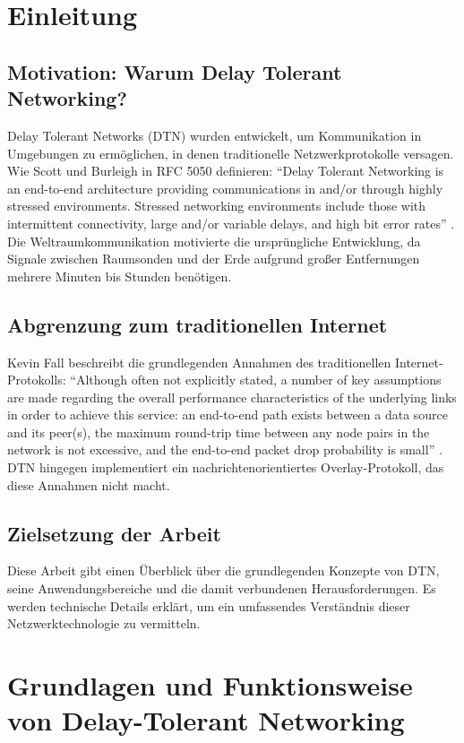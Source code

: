 \documentclass[paper=a4,fontsize=12pt,ngerman]{scrartcl}
\begin{document}
\section{Einleitung}

\subsection{Motivation: Warum Delay Tolerant Networking?}
Delay Tolerant Networks (DTN) wurden entwickelt, um Kommunikation in Umgebungen zu ermöglichen, in denen traditionelle Netzwerkprotokolle versagen. 
Wie Scott und Burleigh in RFC 5050 definieren: \enquote{Delay Tolerant Networking is an end-to-end architecture providing communications in and/or through highly stressed environments. Stressed networking environments include those with intermittent connectivity, large and/or variable delays, and high bit error rates} \cite[S. 3]{ScBu07}.
Die Weltraumkommunikation motivierte die ursprüngliche Entwicklung, da Signale zwischen Raumsonden und der Erde aufgrund großer Entfernungen mehrere Minuten bis Stunden benötigen.

\subsection{Abgrenzung zum traditionellen Internet}
Kevin Fall beschreibt die grundlegenden Annahmen des traditionellen Internet-Protokolls: \enquote{Although often not explicitly stated, a number of key assumptions are made regarding the overall performance characteristics of the underlying links in order to achieve this service: an end-to-end path exists between a data source and its peer(s), the maximum round-trip time between any node pairs in the network is not excessive, and the end-to-end packet drop probability is small} \cite[S. 27]{Fall03}.
DTN hingegen implementiert ein nachrichtenorientiertes Overlay-Protokoll, das diese Annahmen nicht macht\cite[S. 5]{NASA25}.

\subsection{Zielsetzung der Arbeit}
Diese Arbeit gibt einen Überblick über die grundlegenden Konzepte von DTN, seine Anwendungsbereiche und die damit verbundenen Herausforderungen.
Es werden technische Details erklärt, um ein umfassendes Verständnis dieser Netzwerktechnologie zu vermitteln.


\section{Grundlagen und Funktionsweise von Delay-Tolerant Networking}
\end{document}
